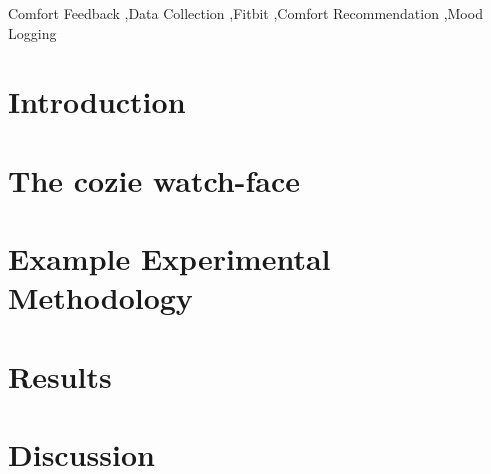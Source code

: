\documentclass[preprint,11pt,3p]{elsarticle} %
\begin{document}
\begin{frontmatter}
\begin{abstract}



\end{abstract}

\begin{keyword}
Comfort Feedback \sep Data Collection \sep Fitbit \sep Comfort Recommendation \sep Mood Logging
\end{keyword}

\end{frontmatter}

\section{Introduction}
\label{ch:introduction}


\section{The cozie watch-face}
\label{ch:cozie}


\section{Example Experimental Methodology}
\label{ch:method}


\section{Results}
\label{ch:results}



\section{Discussion}
\label{ch:discussion}

\end{document}
